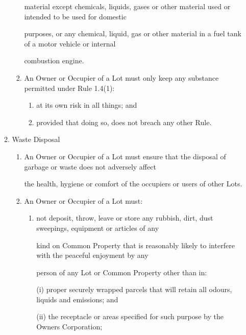 \documentclass{article}
\begin{document}
\begin{enumerate}[label=\arabic*.]
\begin{enumerate}[label=\arabic{enumi}.\arabic*.]
\begin{enumerate}[label=(\arabic*)]
{\fontsize{10.02}{1}material except chemicals, liquids, gases or other material used or intended to be used for domestic }

{\fontsize{10.02}{1}purposes, or any chemical, liquid, gas or other material in a fuel tank of a motor vehicle or internal }

{\fontsize{10.02}{1}combustion engine. }

\item {\fontsize{9.962}{1} An Owner or Occupier of a Lot must only keep any substance permitted under Rule 1.4(1): }

\begin{enumerate}[label=(\alph*)]
\item {\fontsize{9.962}{1} at its own risk in all things; and }

\item {\fontsize{9.962}{1} provided that doing so, does not breach any other Rule. }

\end{enumerate}
\end{enumerate}
\item {\fontsize{9.99}{1} Waste Disposal }

\begin{enumerate}[label=(\arabic*)]
\item {\fontsize{9.962}{1} An Owner or Occupier of a Lot must ensure that the disposal of garbage or waste does not adversely affect }

{\fontsize{10.02}{1}the health, hygiene or comfort of the occupiers or users of other Lots. }

\item {\fontsize{9.962}{1} An Owner or Occupier of a Lot must: }

\begin{enumerate}[label=(\alph*)]
\item {\fontsize{9.962}{1} not deposit, throw, leave or store any rubbish, dirt, dust sweepings, equipment or articles of any }

{\fontsize{10.02}{1}kind on Common Property that is reasonably likely to interfere with the peaceful enjoyment by any }

{\fontsize{10.02}{1}person of any Lot or Common Property other than in: }

{\fontsize{9.962}{1}(i) proper securely wrapped parcels that will retain all odours, liquids and emissions; and }

{\fontsize{9.962}{1}(ii) the receptacle or areas specified for such purpose by the Owners Corporation; }


\end{enumerate}
\end{enumerate}
\end{enumerate}
\end{enumerate}
\end{document}
